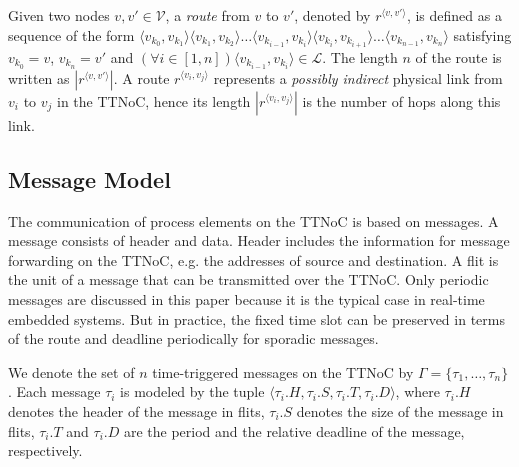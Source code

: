 \documentclass[journal]{IEEEtran}
\newcommand{\calV}{\mathcal{V}}
\newcommand{\calL}{\mathcal{L}}
\newcommand{\route}[3]{#1^{\langle #2,#3\rangle}}
\begin{document}
Given two nodes $v,v'\in\calV$, a \emph{route} from $v$ to $v'$,
denoted by $\route{r}{v}{v'}$, is defined as a sequence of the form
$\langle v_{k_0},v_{k_1}\rangle\langle
v_{k_1},v_{k_2}\rangle\ldots\langle v_{k_{i-1}},v_{k_i}\rangle\langle
v_{k_i},v_{k_{i+1}}\rangle\ldots \langle v_{k_{n-1}},v_{k_n}\rangle$
satisfying $v_{k_0}=v$, $v_{k_n}=v'$ and $(\forall i\in [1,n])\langle
v_{k_{i-1}},v_{k_i}\rangle \in\calL$. The length $n$ of the route is
written as $|\route{r}{v}{v'}|$. A route $\route{r}{v_i}{v_j}$
represents a \emph{possibly indirect} physical link from $v_i$ to
$v_j$ in the TTNoC, hence its length $|\route{r}{v_i}{v_j}|$ is the
number of hops along this link.



\subsection{Message Model}
The communication of process elements on the TTNoC is based on
messages.  A message consists of header and data.  Header includes the
information for message forwarding on the TTNoC, e.g. the addresses of
source and destination.  A flit is the unit of a message that can be
transmitted over the TTNoC.  Only periodic messages are discussed in
this paper because it is the typical case in real-time embedded
systems.  But in practice, the fixed time slot can be preserved in
terms of the route and deadline periodically for sporadic messages.

We denote the set of $n$ time-triggered messages on the TTNoC by
$\Gamma = \{\tau_{1},\dots,\tau_{n}\}$. Each message $\tau_{i}$ is
modeled by the tuple $\langle \tau_{i}.H,\tau_{i}.S, \tau_{i}.T,
\tau_{i}.D\rangle$, 
where $\tau_{i}.H$ denotes the header of the message in flits,
$\tau_{i}.S$ denotes the size of the message in flits, 
$\tau_{i}.T$ and $\tau_{i}.D$ are the period and the relative deadline of the message, respectively.
 
\end{document}
